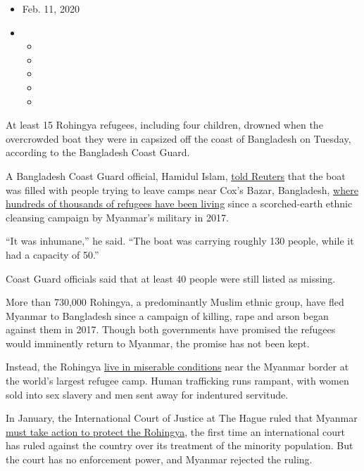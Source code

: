 \begin{itemize}
\item
  Feb. 11, 2020
\item
  \begin{itemize}
  \item
  \item
  \item
  \item
  \item
  \end{itemize}
\end{itemize}

At least 15 Rohingya refugees, including four children, drowned when the
overcrowded boat they were in capsized off the coast of Bangladesh on
Tuesday, according to the Bangladesh Coast Guard.

A Bangladesh Coast Guard official, Hamidul Islam,
\href{https://www.reuters.com/article/us-myanmar-rohingya-accident/at-least-15-rohingya-refugees-die-in-boat-capsize-idUSKBN2050G2}{told
Reuters} that the boat was filled with people trying to leave camps near
Cox's Bazar, Bangladesh,
\href{https://www.nytimes.com/2019/08/22/world/asia/rohingya-myanmar-repatriation.html}{where
hundreds of thousands of refugees have been living} since a
scorched-earth ethnic cleansing campaign by Myanmar's military in 2017.

``It was inhumane,'' he said. ``The boat was carrying roughly 130
people, while it had a capacity of 50.''

Coast Guard officials said that at least 40 people were still listed as
missing.

More than 730,000 Rohingya, a predominantly Muslim ethnic group, have
fled Myanmar to Bangladesh since a campaign of killing, rape and arson
began against them in 2017. Though both governments have promised the
refugees would imminently return to Myanmar, the promise has not been
kept.

Instead, the Rohingya
\href{https://www.nytimes.com/2017/09/29/world/asia/rohingya-refugees-myanmar-bangladesh.html}{live
in miserable conditions} near the Myanmar border at the world's largest
refugee camp. Human trafficking runs rampant, with women sold into sex
slavery and men sent away for indentured servitude.

In January, the International Court of Justice at The Hague ruled that
Myanmar
\href{https://www.nytimes.com/2020/01/23/world/asia/myanmar-rohingya-genocide.html}{must
take action to protect the Rohingya}, the first time an international
court has ruled against the country over its treatment of the minority
population. But the court has no enforcement power, and Myanmar rejected
the ruling.

